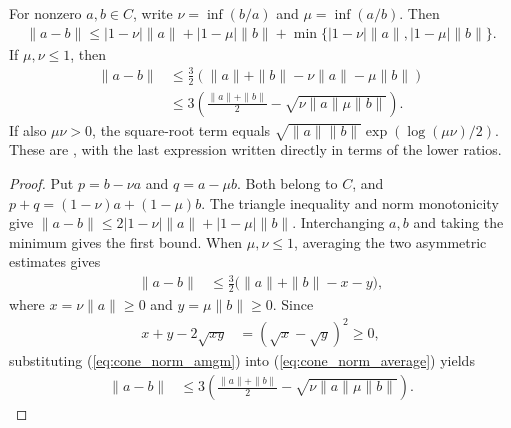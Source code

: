 \begin{theorem}
    \label{thm:cone_ratio_norm_bound}
    \leanok
    For nonzero $a,b\in C$, write $\nu=\inf(b/a)$ and $\mu=\inf(a/b)$. Then
    \begin{align}
        \|a-b\|\le |1-\nu|\|a\|+|1-\mu|\|b\|
            +\min\{|1-\nu|\|a\|,|1-\mu|\|b\|\}.
    \end{align}
    If $\mu,\nu\le1$, then
    \begin{align}
        \|a-b\|&\le\frac32(\|a\|+\|b\|-\nu\|a\|-\mu\|b\|)\\
        &\le3\left(\frac{\|a\|+\|b\|}{2}
             -\sqrt{\nu\|a\|\mu\|b\|}\right).
    \end{align}
    If also $\mu\nu>0$, the square-root term equals
    $\sqrt{\|a\|\|b\|}\exp(\log(\mu\nu)/2)$.
    These are \cite[Chapter~8, Equations~(8.63), (8.68)--(8.69)]{Wolf2012Quantum},
    with the last expression written directly in terms of the lower ratios.
\end{theorem}
\begin{proof}\leanok
    Put $p=b-\nu a$ and $q=a-\mu b$. Both belong to $C$, and
    $p+q=(1-\nu)a+(1-\mu)b$. The triangle inequality and norm monotonicity give
    $\|a-b\|\le2|1-\nu|\|a\|+|1-\mu|\|b\|$.
    Interchanging $a,b$ and taking the minimum gives the first bound.
    When $\mu,\nu\le1$, averaging the two asymmetric estimates gives
    \begin{align}
        \|a-b\|&\le\frac32\bigl(\|a\|+\|b\|-x-y\bigr),
        \label{eq:cone_norm_average}
    \end{align}
    where $x=\nu\|a\|\ge0$ and $y=\mu\|b\|\ge0$. Since
    \begin{align}
        x+y-2\sqrt{xy}&=(\sqrt{x}-\sqrt{y})^2\ge0,
        \label{eq:cone_norm_amgm}
    \end{align}
    substituting (\ref{eq:cone_norm_amgm}) into (\ref{eq:cone_norm_average}) yields
    \begin{align}
        \|a-b\|&\le3\left(\frac{\|a\|+\|b\|}{2}
            -\sqrt{\nu\|a\|\mu\|b\|}\right).
    \end{align}
\end{proof}

